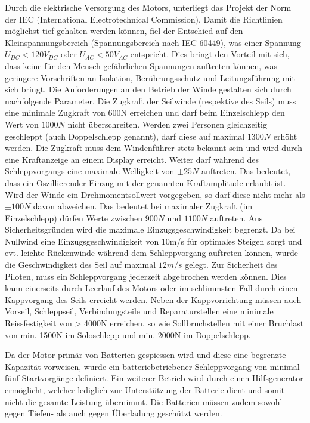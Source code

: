 Durch die elektrische Versorgung des Motors, unterliegt das Projekt der Norm der IEC (International Electrotechnical Commission). Damit die Richtlinien möglichst tief gehalten werden können, fiel der Entschied auf den Kleinspannungsbereich (Spannungsbereich  nach IEC 60449), was einer Spannung $U_{DC}<120V_{DC}$ oder $U_{AC}<50V_{AC}$ entspricht. Dies bringt den Vorteil mit sich, dass keine für den Mensch gefährlichen Spannungen auftreten können, was geringere Vorschriften an Isolation, Berührungsschutz und Leitungsführung mit sich bringt.
Die Anforderungen an den Betrieb der Winde gestalten sich durch nachfolgende Parameter. Die Zugkraft der Seilwinde (respektive des Seils) muss eine minimale Zugkraft von 600N erreichen und darf beim Einzelschlepp den Wert von $ 1000N $ nicht überschreiten. Werden zwei Personen gleichzeitig geschleppt (auch Doppelschlepp genannt), darf diese auf maximal $ 1300N $ erhöht werden. Die Zugkraft muss dem Windenführer stets bekannt sein und wird durch eine Kraftanzeige an einem Display erreicht.
Weiter darf während des Schleppvorgangs eine maximale Welligkeit von $\pm 25N$ auftreten. Das bedeutet, dass ein Oszillierender Einzug mit der genannten Kraftamplitude erlaubt ist. Wird der Winde ein Drehmomentsollwert vorgegeben, so darf diese nicht mehr als $\pm 100N$ davon abweichen. Das bedeutet bei maximaler Zugkraft (im Einzelschlepp) dürfen Werte zwischen $ 900N $ und $ 1100N $ auftreten. Aus Sicherheitsgründen wird die maximale Einzugsgeschwindigkeit begrenzt. Da bei Nullwind eine Einzugsgeschwindigkeit von 10m/s für optimales Steigen sorgt und evt. leichte Rückenwinde während dem Schleppvorgang auftreten können, wurde die Geschwindigkeit des Seil auf maximal $ 12m/s $ gelegt.
Zur Sicherheit des Piloten, muss ein Schleppvorgang jederzeit abgebrochen werden können. Dies kann einerseits durch Leerlauf des Motors oder im schlimmsten Fall durch einen Kappvorgang des Seils erreicht werden. Neben der Kappvorrichtung müssen auch Vorseil, Schleppseil, Verbindungsteile und Reparaturstellen eine minimale Reissfestigkeit von > 4000N erreichen, so wie Sollbruchstellen mit einer Bruchlast von min. 1500N im Soloschlepp und min. 2000N im Doppelschlepp.


Da der Motor primär von Batterien gespiessen wird und diese eine begrenzte Kapazität vorweisen, wurde ein batteriebetriebener Schleppvorgang von minimal fünf Startvorgänge definiert. Ein weiterer Betrieb wird durch einen Hilfsgenerator ermöglicht, welcher lediglich zur Unterstützung der Batterie dient und somit nicht die gesamte Leistung übernimmt. Die Batterien müssen zudem sowohl gegen Tiefen- als auch gegen Überladung geschützt werden.